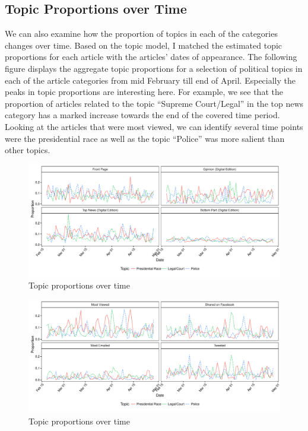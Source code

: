 \documentclass[12pt]{article}
\begin{document}
\begin{doublespace}
\section{Topic Proportions over Time}

We can also examine how the proportion of topics in each of the categories changes over time. Based on the topic model, I matched the estimated topic proportions for each article with the articles' dates of appearance. The following figure displays the aggregate topic proportions for a selection of political topics in each of the article categories from mid February till end of April. Especially the peaks in topic proportions are interesting here. For example, we see that the proportion of articles related to the topic ``Supreme Court/Legal'' in the top news category has a marked increase towards the end of the covered time period. Looking at the articles that were most viewed, we can identify several time points were the presidential race as well as the topic ``Police'' was more salient than other topics.


\begin{figure}
\caption{Topic proportions over time}\label{fig:series_nyt_main}
\includegraphics[width=\textwidth]{../calc/fig/series_nyt_main} 
\end{figure}

\begin{figure}
\caption{Topic proportions over time}\label{fig:series_share_main}
\includegraphics[width=\textwidth]{../calc/fig/series_share_main} 
\end{figure}


\end{doublespace}
\end{document}

